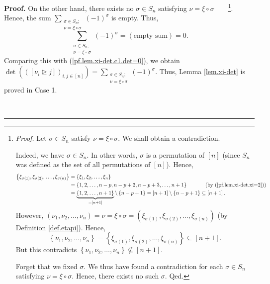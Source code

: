 \documentclass
[numbers=enddot,12pt,final,onecolumn,notitlepage,english]{scrartcl}%
\theoremstyle{definition}
\newenvironment{proof}[1][Proof]{\noindent\textbf{#1.} }{\ \rule{0.5em}{0.5em}}
\let\sumnonlimits\sum
\renewcommand{\sum}{\sumnonlimits\limits}
\newenvironment{verlong}{}{}
\begin{document}
\begin{proof}
\begin{verlong}
On the other hand, there exists no $\sigma\in S_{n}$ satisfying $\nu=\xi
\circ\sigma$\ \ \ \ \footnote{\textit{Proof.} Let $\sigma\in S_{n}$ satisfy
$\nu=\xi\circ\sigma$. We shall obtain a contradiction.
\par
Indeed, we have $\sigma\in S_{n}$. In other words, $\sigma$ is a permutation
of $\left[  n\right]  $ (since $S_{n}$ was defined as the set of all
permutations of $\left[  n\right]  $). Hence,
\begin{align*}
\left\{  \xi_{\sigma\left(  1\right)  },\xi_{\sigma\left(  2\right)  }%
,\ldots,\xi_{\sigma\left(  n\right)  }\right\}   &  =\left\{  \xi_{1},\xi
_{2},\ldots,\xi_{n}\right\} \\
&  =\left\{  1,2,\ldots,n-p,n-p+2,n-p+3,\ldots,n+1\right\}
\ \ \ \ \ \ \ \ \ \ \left(  \text{by (\ref{pf.lem.xi-det.xi=2})}\right) \\
&  =\underbrace{\left\{  1,2,\ldots,n+1\right\}  }_{=\left[  n+1\right]
}\setminus\left\{  n-p+1\right\}  =\left[  n+1\right]  \setminus\left\{
n-p+1\right\}  \subseteq\left[  n+1\right]  .
\end{align*}
However, $\left(  \nu_{1},\nu_{2},\ldots,\nu_{n}\right)  =\nu=\xi\circ
\sigma=\left(  \xi_{\sigma\left(  1\right)  },\xi_{\sigma\left(  2\right)
},\ldots,\xi_{\sigma\left(  n\right)  }\right)  $ (by Definition
\ref{def.etapi}). Hence,
\[
\left\{  \nu_{1},\nu_{2},\ldots,\nu_{n}\right\}  =\left\{  \xi_{\sigma\left(
1\right)  },\xi_{\sigma\left(  2\right)  },\ldots,\xi_{\sigma\left(  n\right)
}\right\}  \subseteq\left[  n+1\right]  .
\]
But this contradicts $\left\{  \nu_{1},\nu_{2},\ldots,\nu_{n}\right\}
\not \subseteq \left[  n+1\right]  $.
\par
Forget that we fixed $\sigma$. We thus have found a contradiction for each
$\sigma\in S_{n}$ satisfying $\nu=\xi\circ\sigma$. Hence, there exists no such
$\sigma$. Qed.}. Hence, the sum $\sum_{\substack{\sigma\in S_{n};\\\nu
=\xi\circ\sigma}}\left(  -1\right)  ^{\sigma}$ is empty. Thus,%
\[
\sum_{\substack{\sigma\in S_{n};\\\nu=\xi\circ\sigma}}\left(  -1\right)
^{\sigma}=\left(  \text{empty sum}\right)  =0.
\]
Comparing this with (\ref{pf.lem.xi-det.c1.det=0}), we obtain $\det\left(
\left(  \left[  \nu_{i}\trianglerighteq j\right]  \right)  _{i,j\in\left[
n\right]  }\right)  =\sum_{\substack{\sigma\in S_{n};\\\nu=\xi\circ\sigma
}}\left(  -1\right)  ^{\sigma}$. Thus, Lemma \ref{lem.xi-det} is proved in
Case 1. \medskip
\end{verlong}


\end{proof}
\end{document}
